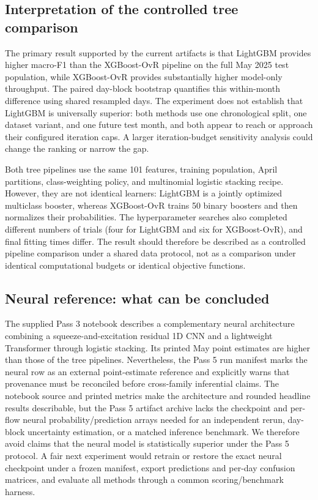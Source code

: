 \documentclass[conference]{IEEEtran}
\begin{document}
\subsection{Interpretation of the controlled tree comparison}

The primary result supported by the current artifacts is that LightGBM provides higher macro-F1 than the XGBoost-OvR pipeline on the full May 2025 test population, while XGBoost-OvR provides substantially higher model-only throughput. The paired day-block bootstrap quantifies this within-month difference using shared resampled days. The experiment does not establish that LightGBM is universally superior: both methods use one chronological split, one dataset variant, and one future test month, and both appear to reach or approach their configured iteration caps. A larger iteration-budget sensitivity analysis could change the ranking or narrow the gap.

Both tree pipelines use the same 101 features, training population, April partitions, class-weighting policy, and multinomial logistic stacking recipe. However, they are not identical learners: LightGBM is a jointly optimized multiclass booster, whereas XGBoost-OvR trains 50 binary boosters and then normalizes their probabilities. The hyperparameter searches also completed different numbers of trials (four for LightGBM and six for XGBoost-OvR), and final fitting times differ. The result should therefore be described as a controlled pipeline comparison under a shared data protocol, not as a comparison under identical computational budgets or identical objective functions.

\subsection{Neural reference: what can be concluded}

The supplied Pass 3 notebook describes a complementary neural architecture combining a squeeze-and-excitation residual 1D CNN and a lightweight Transformer through logistic stacking. Its printed May point estimates are higher than those of the tree pipelines. Nevertheless, the Pass 5 run manifest marks the neural row as an external point-estimate reference and explicitly warns that provenance must be reconciled before cross-family inferential claims. The notebook source and printed metrics make the architecture and rounded headline results describable, but the Pass 5 artifact archive lacks the checkpoint and per-flow neural probability/prediction arrays needed for an independent rerun, day-block uncertainty estimation, or a matched inference benchmark. We therefore avoid claims that the neural model is statistically superior under the Pass 5 protocol. A fair next experiment would retrain or restore the exact neural checkpoint under a frozen manifest, export predictions and per-day confusion matrices, and evaluate all methods through a common scoring/benchmark harness.
\end{document}
